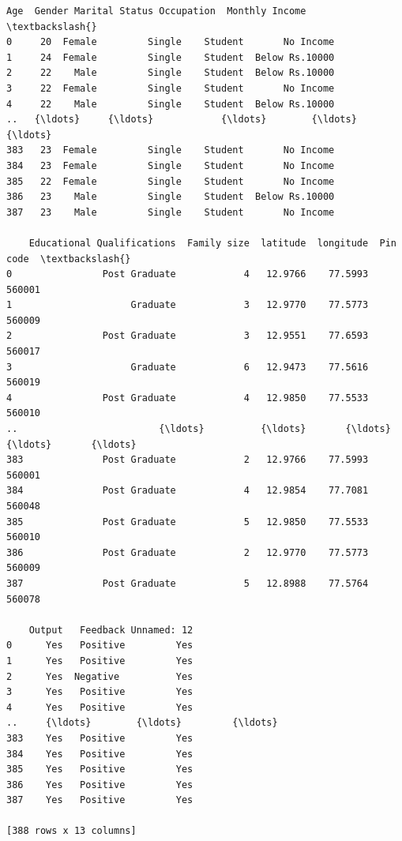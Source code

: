 \documentclass[11pt]{article}
\makeatletter
\newcommand{\boxspacing}{\kern\kvtcb@left@rule\kern\kvtcb@boxsep}
\newcommand{\prompt}[4]{
        {\ttfamily\llap{{\color{#2}[#3]:\hspace{3pt}#4}}\vspace{-\baselineskip}}
    }
\makeatother
\begin{document}
            \begin{tcolorbox}[breakable, size=fbox, boxrule=.5pt, pad at break*=1mm, opacityfill=0]
\prompt{Out}{outcolor}{4}{\boxspacing}
\begin{Verbatim}[commandchars=\\\{\}]
     Age  Gender Marital Status Occupation  Monthly Income  \textbackslash{}
0     20  Female         Single    Student       No Income
1     24  Female         Single    Student  Below Rs.10000
2     22    Male         Single    Student  Below Rs.10000
3     22  Female         Single    Student       No Income
4     22    Male         Single    Student  Below Rs.10000
..   {\ldots}     {\ldots}            {\ldots}        {\ldots}             {\ldots}
383   23  Female         Single    Student       No Income
384   23  Female         Single    Student       No Income
385   22  Female         Single    Student       No Income
386   23    Male         Single    Student  Below Rs.10000
387   23    Male         Single    Student       No Income

    Educational Qualifications  Family size  latitude  longitude  Pin code  \textbackslash{}
0                Post Graduate            4   12.9766    77.5993    560001
1                     Graduate            3   12.9770    77.5773    560009
2                Post Graduate            3   12.9551    77.6593    560017
3                     Graduate            6   12.9473    77.5616    560019
4                Post Graduate            4   12.9850    77.5533    560010
..                         {\ldots}          {\ldots}       {\ldots}        {\ldots}       {\ldots}
383              Post Graduate            2   12.9766    77.5993    560001
384              Post Graduate            4   12.9854    77.7081    560048
385              Post Graduate            5   12.9850    77.5533    560010
386              Post Graduate            2   12.9770    77.5773    560009
387              Post Graduate            5   12.8988    77.5764    560078

    Output   Feedback Unnamed: 12
0      Yes   Positive         Yes
1      Yes   Positive         Yes
2      Yes  Negative          Yes
3      Yes   Positive         Yes
4      Yes   Positive         Yes
..     {\ldots}        {\ldots}         {\ldots}
383    Yes   Positive         Yes
384    Yes   Positive         Yes
385    Yes   Positive         Yes
386    Yes   Positive         Yes
387    Yes   Positive         Yes

[388 rows x 13 columns]
\end{Verbatim}
\end{tcolorbox}
        
\end{document}

